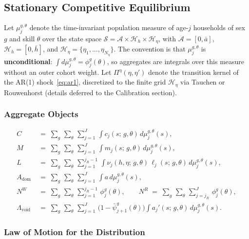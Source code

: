 \documentclass[12pt,a4paper]{article}
\begin{document}
\subsection{Stationary Competitive Equilibrium}
\label{subsec:equilibrium}

Let $\mu_j^{g,\theta}$ denote the time-invariant population measure of age-$j$ households of sex $g$ and skill $\theta$ over the state space $\mathcal{S} = \mathcal{A} \times \mathcal{H}_h \times \mathcal{H}_\eta$, with $\mathcal{A} = [0, \bar a]$, $\mathcal{H}_h = [0, \bar h]$, and $\mathcal{H}_\eta = \{\eta_1, \ldots, \eta_{N_\eta}\}$. The convention is that $\mu_{j}^{g,\theta}$ is \textbf{unconditional}: $\int d\mu_j^{g,\theta} = \phi_j^{g}(\theta)$, so aggregates are integrals over this measure without an outer cohort weight. Let $\Pi^\eta(\eta, \eta')$ denote the transition kernel of the AR(1) shock~\eqref{eq:ar1}, discretized to the finite grid $\mathcal{H}_\eta$ via Tauchen or Rouwenhorst (details deferred to the Calibration section).

\subsubsection{Aggregate Objects}

\begin{align}
C &\;=\; \sum_g\,\sum_\theta\, \sum_{j=1}^{J}\, \int c_j(s;\, g, \theta)\, d\mu_j^{g,\theta}(s), \label{eq:agg_C}\\
M &\;=\; \sum_g\,\sum_\theta\, \sum_{j=1}^{J}\, \int m_j(s;\, g, \theta)\, d\mu_j^{g,\theta}(s), \label{eq:agg_M}\\
L &\;=\; \sum_g\,\sum_\theta\, \sum_{j=1}^{j_R - 1}\, \int \nu_j(h, \eta;\, g, \theta)\, \ell_j(s;\, g, \theta)\, d\mu_j^{g,\theta}(s), \label{eq:agg_L}\\
A_{\mathrm{dom}} &\;=\; \sum_g\,\sum_\theta\, \sum_{j=1}^{J}\, \int a\, d\mu_j^{g,\theta}(s), \label{eq:agg_A}\\
N^W &\;=\; \sum_g\,\sum_\theta\, \sum_{j=1}^{j_R - 1}\, \phi_{j}^{g}(\theta), \qquad N^R \;=\; \sum_g\,\sum_\theta\, \sum_{j=j_R}^{J}\, \phi_{j}^{g}(\theta), \label{eq:agg_NWR}\\
\Lambda_{\mathrm{void}} &\;=\; \sum_g\,\sum_\theta\, \sum_{j=1}^{J}\, \bigl(1 - \bar\psi_{j+1}^{g}(\theta)\bigr) \int a_j'(s;\, g, \theta)\, d\mu_j^{g,\theta}(s). \label{eq:agg_Lvoided}
\end{align}

\subsubsection{Law of Motion for the Distribution}
\end{document}
